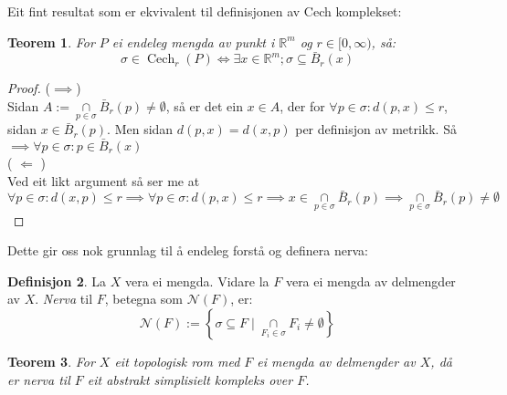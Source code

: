 \documentclass[a4paper, titlepage, 12pt, norsk]{article}
\theoremstyle{plain}
\newtheorem{theorem}{Teorem}[section]
\theoremstyle{definition}
\newtheorem{definition}[theorem]{Definisjon}
\newcommand{\Rb}{\mathbb{R}}
\newcommand{\Nc}{\mathcal{N}}
\DeclareMathOperator{\Cech}{Cech}
\newcommand{\intersect}{ \mathop{\cap}\limits } %
\begin{document}
Eit fint resultat som er ekvivalent til definisjonen av Cech komplekset:

\begin{theorem}
	For $P$ ei endeleg mengda av punkt i $\Rb^m$ og $r\in[0, \infty)$, så:
	\begin{equation*}
		\sigma\in \Cech_r(P) \Longleftrightarrow \exists x\in\Rb^m; \sigma \subseteq \bar{B}_r(x)
	\end{equation*}
\end{theorem}

\begin{proof}
	($\implies$)
	\\Sidan $A:=\intersect_{p\in\sigma}\bar{B}_r(p)\neq\emptyset$, så er det ein $x\in A$, der for $\forall p\in\sigma: d(p,x)\leq r$, sidan $x\in\bar{B}_r(p)$.
	Men sidan $d(p,x)=d(x,p)$ per definisjon av metrikk. 
	Så $\implies \forall p\in\sigma: p \in \bar{B}_r(x)$
	\\( \( \Longleftarrow \) )
	\\Ved eit likt argument så ser me at  $\forall p \in \sigma : d(x, p) \leq r \implies \forall p \in \sigma : d(p, x) \leq r \implies x \in \intersect_{p \in \sigma} \bar{B}_r(p) \implies \intersect_{p \in \sigma} \bar{B}_r(p) \neq \emptyset$
\end{proof}

Dette gir oss nok grunnlag til å endeleg forstå og definera nerva:

\begin{definition} %
	La $X$ vera ei mengda. Vidare la $F$ vera ei mengda av delmengder av $X$. \emph{Nerva} til $F$, betegna som $\Nc(F)$, er:
	\begin{equation*}
		\Nc(F) := \left \{ \sigma \subseteq F \mid \intersect_{ F_i \in \sigma } F_i \neq \emptyset \right \}
	\end{equation*}
\end{definition}

\begin{theorem}
	For $X$ eit topologisk rom med $F$ ei mengda av delmengder av $X$, då er nerva til $F$ eit abstrakt simplisielt kompleks over $F$.
\end{theorem}
\end{document}
